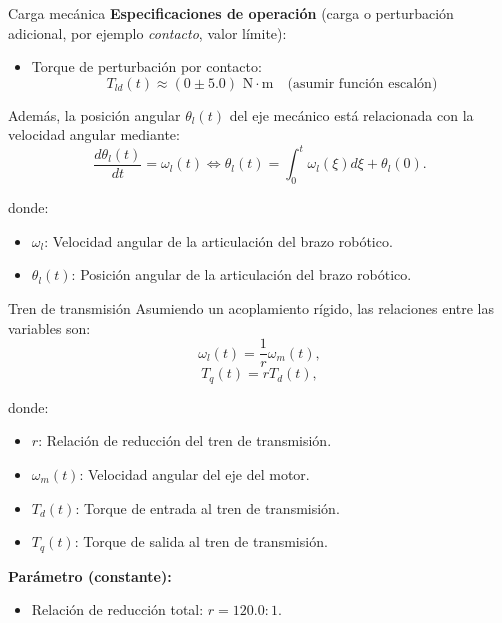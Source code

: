 \documentclass[12pt]{beamer}
\begin{document}
\begin{frame}{Carga mecánica} \footnotesize
\textbf{Especificaciones de operación} (carga o perturbación adicional, por ejemplo \textit{contacto}, valor límite):

\begin{itemize}
    \item Torque de perturbación por contacto:  
    \[
    T_{ld}(t) \approx (0 \pm 5.0) \text{ N} \cdot \text{m} \quad \text{(asumir función escalón)}
    \]
\end{itemize}

Además, la posición angular \( \theta_l(t) \) del eje mecánico está relacionada con la velocidad angular mediante:
\begin{equation}
    \frac{d\theta_l(t)}{dt} = \omega_l(t) \iff \theta_l(t) = \int_{0}^{t} \omega_l(\xi) d\xi + \theta_l(0).
\end{equation}

donde:
\begin{itemize}
    \item \( \omega_l \): Velocidad angular de la articulación del brazo robótico.
    \item \( \theta_l(t) \): Posición angular de la articulación del brazo robótico.
\end{itemize}

\end{frame}


\begin{frame}{Tren de transmisión}
    Asumiendo un acoplamiento rígido, las relaciones entre las variables son:
\begin{equation}
\label{eq:transmision_velocidades}
    \omega_l(t) = \frac{1}{r} \omega_m(t),
\end{equation}
\begin{equation}
\label{eq:transmision_torques}
    T_q(t) = r T_d(t),
\end{equation}

donde:
\begin{itemize}
    \item \( r \): Relación de reducción del tren de transmisión.
    \item \( \omega_m(t) \): Velocidad angular del eje del motor.
    \item \( T_d(t) \): Torque de entrada al tren de transmisión.
    \item \( T_q(t) \): Torque de salida al tren de transmisión.
\end{itemize}

\textbf{Parámetro (constante):}
\begin{itemize}
    \item Relación de reducción total: \( r = 120.0 : 1 \).
\end{itemize}
\end{frame}
\end{document}
